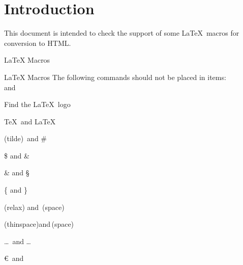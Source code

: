 \documentclass{article}
\begin{document}
\section*{Introduction}

This document is intended to check the support of some \LaTeX\ macros for 
conversion to HTML.

\begin{quiz}[points=1]{LaTeX Macros}
\begin{multi}{LaTeX Macros}
The following commands should not be placed in items: \\ and \par
Find the \LaTeX\ logo
\item* \TeX\ and \LaTeX
\item (tilde)~and \#
\item \$ and \&
\item \& and \S
\item \{ and \}
\item (relax) \relax and\ (space)
\item (thinspace)\thinspace and\,(space)
\item \ldots\ and \dots
\item \euro\ and \texteuro
\end{multi}

\end{quiz}
\end{document}
